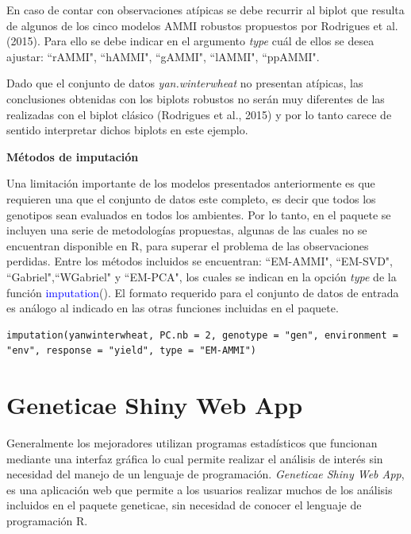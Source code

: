 En caso de contar con observaciones atípicas se debe recurrir al biplot que resulta de algunos de los cinco modelos AMMI robustos propuestos por Rodrigues et al. (2015). Para ello se debe indicar en el argumento \emph{type} cuál de ellos se desea ajustar: ``rAMMI", ``hAMMI", ``gAMMI", ``lAMMI", ``ppAMMI".

Dado que el conjunto de datos \emph{yan.winterwheat} no presentan atípicas, las conclusiones obtenidas con los biplots robustos no serán muy diferentes de las realizadas con el biplot clásico (Rodrigues et al., 2015) y por lo tanto carece de sentido interpretar dichos biplots en este ejemplo. 



\textbf{Métodos de imputación}

Una limitación importante de los modelos presentados anteriormente es que requieren una que el conjunto de datos este completo, es decir que todos los genotipos sean evaluados en todos los ambientes. Por lo tanto, en el paquete se incluyen una serie de metodologías propuestas, algunas de las cuales no se encuentran disponible en R, para superar el problema de las observaciones perdidas. Entre los métodos incluidos se encuentran: ``EM-AMMI", ``EM-SVD", ``Gabriel",``WGabriel" y ``EM-PCA", los cuales se indican en la opción \emph{type} de la función \textcolor{blue}{imputation}(). El formato requerido para el conjunto de datos de entrada es análogo al indicado en las otras funciones incluidas en el paquete.

\begin{tcolorbox}[skin=bicolor,
    colframe=aurometalsaurus,colback=backcolour,colbacklower=white,
    width=1\linewidth,
    height=0.1\linewidth,
    boxsep=-3mm]
\begin{lstlisting}
imputation(yanwinterwheat, PC.nb = 2, genotype = "gen", environment = "env", response = "yield", type = "EM-AMMI")
\end{lstlisting}
\end{tcolorbox}
\section{Geneticae Shiny Web App}

Generalmente los mejoradores utilizan programas estadísticos que funcionan mediante una interfaz gráfica lo cual permite realizar el análisis de interés sin necesidad del manejo de un lenguaje de programación. \emph{Geneticae Shiny Web App}, es una aplicación web que permite a los usuarios realizar muchos de los análisis incluidos en el paquete geneticae, sin necesidad de conocer el lenguaje de programación R. 

